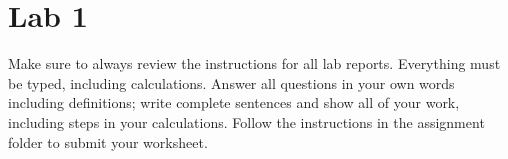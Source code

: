 
\section{Lab 1}

Make sure to always review the instructions for all lab reports. Everything must be typed, including calculations.  Answer all questions in your own words including definitions; write complete sentences and show all of your work, including steps in your calculations. Follow the instructions in the assignment folder to submit your worksheet.


 \newpage %

 \newpage %